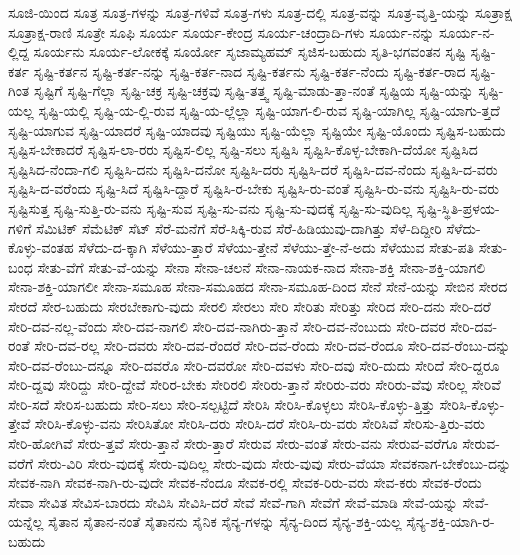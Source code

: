 {ಸೂಜಿ-ಯಿಂದ
ಸೂತ್ರ
ಸೂತ್ರ-ಗಳನ್ನು
ಸೂತ್ರ-ಗಳಿವೆ
ಸೂತ್ರ-ಗಳು
ಸೂತ್ರ-ದಲ್ಲಿ
ಸೂತ್ರ-ವನ್ನು
ಸೂತ್ರ-ವೃತ್ತಿ-ಯನ್ನು
ಸೂತ್ರಾಕ್ಷ
ಸೂತ್ರಾಕ್ಷ-ರಾಣಿ
ಸೂತ್ರೇ
ಸೂಫಿ
ಸೂರ್ಯ
ಸೂರ್ಯ-ಕೇಂದ್ರ
ಸೂರ್ಯ-ಚಂದ್ರಾದಿ-ಗಳು
ಸೂರ್ಯ-ನನ್ನು
ಸೂರ್ಯ-ನ-ಲ್ಲಿದ್ದ
ಸೂರ್ಯನು
ಸೂರ್ಯ-ಲೋಕಕ್ಕೆ
ಸೂರ್ಯೋ
ಸೃಜಾಮ್ಯಹಮ್
ಸೃಜಿಸ-ಬಹುದು
ಸೃತಿ-ಭಗವಂತನ
ಸೃಷ್ಟಿ
ಸೃಷ್ಟಿ-ಕರ್ತ
ಸೃಷ್ಟಿ-ಕರ್ತನ
ಸೃಷ್ಟಿ-ಕರ್ತ-ನನ್ನು
ಸೃಷ್ಟಿ-ಕರ್ತ-ನಾದ
ಸೃಷ್ಟಿ-ಕರ್ತನು
ಸೃಷ್ಟಿ-ಕರ್ತ-ನೆಂದು
ಸೃಷ್ಟಿ-ಕರ್ತ-ರಾದ
ಸೃಷ್ಟಿ-ಗಿಂತ
ಸೃಷ್ಟಿಗೆ
ಸೃಷ್ಟಿ-ಗೆಲ್ಲಾ
ಸೃಷ್ಟಿ-ಚಕ್ರ
ಸೃಷ್ಟಿ-ಚಕ್ರವು
ಸೃಷ್ಟಿ-ತತ್ತ್ವ
ಸೃಷ್ಟಿ-ಮಾಡು-ತ್ತಾ-ನಂತೆ
ಸೃಷ್ಟಿಯ
ಸೃಷ್ಟಿ-ಯನ್ನು
ಸೃಷ್ಟಿ-ಯಲ್ಲ
ಸೃಷ್ಟಿ-ಯಲ್ಲಿ
ಸೃಷ್ಟಿ-ಯ-ಲ್ಲಿ-ರುವ
ಸೃಷ್ಟಿ-ಯ-ಲ್ಲೆಲ್ಲಾ
ಸೃಷ್ಟಿ-ಯಾಗ-ಲಿ-ರುವ
ಸೃಷ್ಟಿ-ಯಾಗಿಲ್ಲ
ಸೃಷ್ಟಿ-ಯಾಗು-ತ್ತದೆ
ಸೃಷ್ಟಿ-ಯಾಗುವ
ಸೃಷ್ಟಿ-ಯಾದರೆ
ಸೃಷ್ಟಿ-ಯಾದವು
ಸೃಷ್ಟಿಯು
ಸೃಷ್ಟಿ-ಯೆಲ್ಲಾ
ಸೃಷ್ಟಿಯೇ
ಸೃಷ್ಟಿ-ಯೊಂದು
ಸೃಷ್ಟಿಸ-ಬಹುದು
ಸೃಷ್ಟಿಸ-ಬೇಕಾದರೆ
ಸೃಷ್ಟಿಸ-ಲಾ-ರರು
ಸೃಷ್ಟಿಸ-ಲಿಲ್ಲ
ಸೃಷ್ಟಿ-ಸಲು
ಸೃಷ್ಟಿಸಿ
ಸೃಷ್ಟಿಸಿ-ಕೊಳ್ಳ-ಬೇಕಾಗಿ-ದೆಯೋ
ಸೃಷ್ಟಿಸಿದ
ಸೃಷ್ಟಿಸಿದ-ನೆಂದಾ-ಗಲಿ
ಸೃಷ್ಟಿಸಿ-ದನು
ಸೃಷ್ಟಿಸಿ-ದನೋ
ಸೃಷ್ಟಿಸಿ-ದರು
ಸೃಷ್ಟಿಸಿ-ದರೆ
ಸೃಷ್ಟಿಸಿ-ದವ-ನೆಂದು
ಸೃಷ್ಟಿಸಿ-ದ-ವರು
ಸೃಷ್ಟಿಸಿ-ದ-ವರೆಂದು
ಸೃಷ್ಟಿ-ಸಿದೆ
ಸೃಷ್ಟಿಸಿ-ದ್ದಾರೆ
ಸೃಷ್ಟಿಸಿ-ರ-ಬೇಕು
ಸೃಷ್ಟಿಸಿ-ರು-ವಂತೆ
ಸೃಷ್ಟಿಸಿ-ರು-ವನು
ಸೃಷ್ಟಿಸಿ-ರು-ವರು
ಸೃಷ್ಟಿಸುತ್ತ
ಸೃಷ್ಟಿ-ಸುತ್ತಿ-ರು-ವನು
ಸೃಷ್ಟಿ-ಸುವ
ಸೃಷ್ಟಿ-ಸು-ವನು
ಸೃಷ್ಟಿ-ಸು-ವುದಕ್ಕೆ
ಸೃಷ್ಟಿ-ಸು-ವುದಿಲ್ಲ
ಸೃಷ್ಟಿ-ಸ್ಥಿತಿ-ಪ್ರಳಯ-ಗಳಿಗೆ
ಸೆಮಿಟಿಕ್
ಸೆಮೆಟಿಕ್
ಸೆಟ್
ಸೆರೆ-ಮನೆಗೆ
ಸೆರೆ-ಸಿಕ್ಕಿ-ರುವ
ಸೆರೆ-ಹಿಡಿಯುವು-ದಾಗಿತ್ತು
ಸೆಳೆ-ದಿದ್ದೀರಿ
ಸೆಳೆದು-ಕೊಳ್ಳು-ವಂತಹ
ಸೆಳೆದು-ದ-ಕ್ಕಾಗಿ
ಸೆಳೆಯು-ತ್ತಾರೆ
ಸೆಳೆಯು-ತ್ತೇನೆ
ಸೆಳೆಯು-ತ್ತೇ-ನೆ-ಅದು
ಸೆಳೆಯುವ
ಸೇತು-ಪತಿ
ಸೇತು-ಬಂಧ
ಸೇತು-ವೆಗೆ
ಸೇತು-ವೆ-ಯನ್ನು
ಸೇನಾ
ಸೇನಾ-ಚಲನೆ
ಸೇನಾ-ನಾಯಕ-ನಾದ
ಸೇನಾ-ಶಕ್ತಿ
ಸೇನಾ-ಶಕ್ತಿ-ಯಾಗಲಿ
ಸೇನಾ-ಶಕ್ತಿ-ಯಾಗಲೀ
ಸೇನಾ-ಸಮೂಹ
ಸೇನಾ-ಸಮೂಹದ
ಸೇನಾ-ಸಮೂಹ-ದಿಂದ
ಸೇನೆ
ಸೇನೆ-ಯನ್ನು
ಸೇಬಿನ
ಸೇರದ
ಸೇರದೆ
ಸೇರ-ಬಹುದು
ಸೇರಬೇಕಾಗು-ವುದು
ಸೇರಲಿ
ಸೇರಲು
ಸೇರಿ
ಸೇರಿತು
ಸೇರಿತ್ತು
ಸೇರಿದ
ಸೇರಿ-ದನು
ಸೇರಿ-ದರೆ
ಸೇರಿ-ದವ-ನಲ್ಲ-ವೆಂದು
ಸೇರಿ-ದವ-ನಾಗಲಿ
ಸೇರಿ-ದವ-ನಾಗಿರು-ತ್ತಾನೆ
ಸೇರಿ-ದವ-ನೆಂಬುದು
ಸೇರಿ-ದವರ
ಸೇರಿ-ದವ-ರಂತೆ
ಸೇರಿ-ದವ-ರಲ್ಲ
ಸೇರಿ-ದವರು
ಸೇರಿ-ದವ-ರೆಂದರೆ
ಸೇರಿ-ದವ-ರೆಂದು
ಸೇರಿ-ದವ-ರೆಂದೂ
ಸೇರಿ-ದವ-ರೆಂಬು-ದನ್ನು
ಸೇರಿ-ದವ-ರೆಂಬು-ದನ್ನೂ
ಸೇರಿ-ದವರೊ
ಸೇರಿ-ದವರೋ
ಸೇರಿ-ದವಳು
ಸೇರಿ-ದವು
ಸೇರಿ-ದುದು
ಸೇರಿದೆ
ಸೇರಿ-ದ್ದರೂ
ಸೇರಿ-ದ್ದವು
ಸೇರಿದ್ದು
ಸೇರಿ-ದ್ದೇವೆ
ಸೇರಿರ-ಬೇಕು
ಸೇರಿರಲಿ
ಸೇರಿರು-ತ್ತಾನೆ
ಸೇರಿರು-ವರು
ಸೇರಿರು-ವೆವು
ಸೇರಿಲ್ಲ
ಸೇರಿವೆ
ಸೇರಿ-ಸದೆ
ಸೇರಿಸ-ಬಹುದು
ಸೇರಿ-ಸಲು
ಸೇರಿ-ಸಲ್ಪಟ್ಟಿದೆ
ಸೇರಿಸಿ
ಸೇರಿಸಿ-ಕೊಳ್ಳಲು
ಸೇರಿಸಿ-ಕೊಳ್ಳು-ತ್ತಿತ್ತು
ಸೇರಿಸಿ-ಕೊಳ್ಳು-ತ್ತೇವೆ
ಸೇರಿಸಿ-ಕೊಳ್ಳು-ವನು
ಸೇರಿಸಿತೋ
ಸೇರಿಸಿ-ದರು
ಸೇರಿಸಿ-ದರೆ
ಸೇರಿಸಿ-ರು-ವರು
ಸೇರಿಸಿವೆ
ಸೇರಿಸು-ತ್ತಿರು-ವರು
ಸೇರಿ-ಹೋಗಿವೆ
ಸೇರು-ತ್ತವೆ
ಸೇರು-ತ್ತಾನೆ
ಸೇರು-ತ್ತಾರೆ
ಸೇರುವ
ಸೇರು-ವಂತೆ
ಸೇರು-ವನು
ಸೇರುವ-ವರೆಗೂ
ಸೇರುವ-ವರೆಗೆ
ಸೇರು-ವಿರಿ
ಸೇರು-ವುದಕ್ಕೆ
ಸೇರು-ವುದಿಲ್ಲ
ಸೇರು-ವುದು
ಸೇರು-ವುವು
ಸೇರು-ವೆಯಾ
ಸೇವಕನಾಗ-ಬೇಕೆಂಬು-ದನ್ನು
ಸೇವಕ-ನಾಗಿ
ಸೇವಕ-ನಾಗಿ-ರು-ವುದೇ
ಸೇವಕ-ನೆಂದೂ
ಸೇವಕ-ರಲ್ಲಿ
ಸೇವಕ-ರಿರು-ವರು
ಸೇವ-ಕರು
ಸೇವಕ-ರೆಂದು
ಸೇವಾ
ಸೇವಿತ
ಸೇವಿಸ-ಬಾರದು
ಸೇವಿಸಿ
ಸೇವಿಸಿ-ದರೆ
ಸೇವೆ
ಸೇವೆ-ಗಾಗಿ
ಸೇವೆಗೆ
ಸೇವೆ-ಮಾಡಿ
ಸೇವೆ-ಯನ್ನು
ಸೇವೆ-ಯನ್ನೆಲ್ಲ
ಸೈತಾನ
ಸೈತಾನ-ನಂತೆ
ಸೈತಾನನು
ಸೈನಿಕ
ಸೈನ್ಯ-ಗಳನ್ನು
ಸೈನ್ಯ-ದಿಂದ
ಸೈನ್ಯ-ಶಕ್ತಿ-ಯಲ್ಲ
ಸೈನ್ಯ-ಶಕ್ತಿ-ಯಾಗಿ-ರ-ಬಹುದು
}
